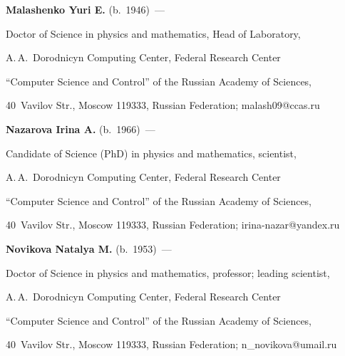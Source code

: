 \vspace*{-18pt}





\Contr





\noindent


\textbf{Malashenko Yuri E.} (b.\ 1946)~--- 


Doctor of Science in physics and mathematics, Head of Laboratory, 


A.\,A.~Dorodnicyn Computing Center, Federal Research Center 


``Computer Science and Control'' of the Russian Academy of Sciences, 


40~Vavilov Str., Moscow 119333, Russian Federation; \mbox{malash09@ccas.ru}










\noindent


\textbf{Nazarova Irina A.} (b.\ 1966)~--- 


Candidate of Science (PhD) in physics and mathematics, scientist, 


A.\,A.~Dorodnicyn Computing Center, Federal Research Center 


``Computer Science and Control'' of the Russian Academy of Sciences, 


40~Vavilov Str., Moscow 119333, Russian Federation; \mbox{irina-nazar@yandex.ru}










\noindent


\textbf{Novikova Natalya M.} (b.\ 1953)~--- 


Doctor of Science in physics and mathematics, professor; leading scientist, 


A.\,A.~Dorodnicyn Computing Center, Federal Research Center 


``Computer Science and Control'' of the Russian Academy of Sciences, 


40~Vavilov Str., Moscow 119333, Russian Federation; \mbox{n\_novikova@umail.ru}


\label{end\stat}








\renewcommand{\bibname}{\protect\rm Литература} 


